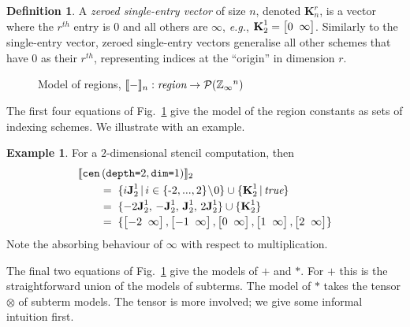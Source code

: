 \documentclass[10pt,preprint]{sigplanconf}
\newcounter{block}
\theoremstyle{definition}
\newtheorem{example}[block]{Example}
\newtheorem{definition}[block]{Definition}
\newcommand{\eg}{\emph{e.g.}}
\newcommand{\interp}[1]{\llbracket{#1}\rrbracket}
\newcommand{\term}[1]{\texttt{#1}}
\newcommand{\stenCenS}[2]{\term{cen} \, (\term{depth=}#1,
  \term{dim=}#2)}
\newcommand{\vtwoh}[2]{\setlength{\arraycolsep}{0em}
\left[\begin{array}{cc}#1 \; & \; #2\end{array}\right]}
\newcommand{\singleEntry}[2]{\textbf{J}_{#2}^{#1}}
\newcommand{\zeroEntry}[2]{\textbf{K}_{#2}^{#1}}
\begin{document}
\begin{definition}
A \emph{zeroed single-entry vector} of size $n$, denoted
$\zeroEntry{r}{n}$, is a vector where the $r^{th}$ entry is $0$ and all others
are $\infty$, \eg{}, $\zeroEntry{1}{2} = \vtwoh{0}{\infty}$.
Similarly to the single-entry vector, zeroed single-entry vectors
generalise all other schemes
that have $0$ as their $r^{th}$, representing indices at
the ``origin'' in dimension $r$.
\end{definition}

\begin{figure}[t]
\vspace{-0.9em}

\caption{Model of regions,
$\interp{-}_n : \textit{region} \rightarrow \mathcal{P}(\domainVal{}^n)$}
\label{fig:region-model}
\vspace{-1em}
\end{figure}

\noindent
The first four equations of Fig.~\ref{fig:region-model}
give the model of the region constants as sets of indexing
schemes. We illustrate with an example.

\begin{example}
For a $2$-dimensional stencil computation, then
\begin{align*}
& \interp{\stenCenS{2}{1}}_2 \\[-0.1em]
& \qquad = \; \{i\singleEntry{1}{2} \,|\, i \in \{\text{-}2,..., 2\}\!\setminus\!0 \}
  \cup  \{ \zeroEntry{1}{2} \,|\, \textit{true} \} \\[-0.2em]
& \qquad = \; \{-2\singleEntry{1}{2}, \, -\singleEntry{1}{2}, \,
  \singleEntry{1}{2}, \, 2\singleEntry{1}{2}\} \cup
  \{\zeroEntry{1}{2}\} \\[-0.2em]
& \qquad = \; \{\vtwoh{-2}{\infty}, \vtwoh{-1}{\infty}, \vtwoh{0}{\infty},
\vtwoh{1}{\infty}, \vtwoh{2}{\infty}\}
\end{align*}
Note the absorbing behaviour of $\infty$ with respect to
multiplication.
\end{example}
\noindent
The final two equations of Fig.~\ref{fig:region-model} give the models
of $\term{+}$ and $\term{*}$. For $\term{+}$ this is the
straightforward union of the models of subterms. The model of
$\term{*}$ takes the tensor $\otimes$ of subterm models. The tensor is
more involved; we give some informal intuition first.

\end{document}
